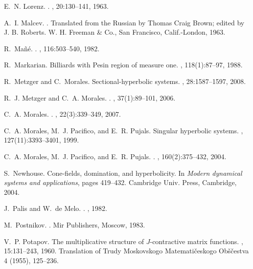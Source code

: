 \documentclass[12pt,reqno]{amsart}
\numberwithin{equation}{section}
\theoremstyle{plain}
\theoremstyle{definition}
\begin{document}
\begin{thebibliography}{10}
E.~N. Lorenz.
.
, {20}:{130--141}, {1963}.

A.~I. Mal{\cprime}cev.
.
\newblock Translated from the Russian by Thomas Craig Brown; edited by J. B.
  Roberts. W. H. Freeman \& Co., San Francisco, Calif.-London, 1963.

R.~Ma{\~n}{\'e}.
.
, {116}:{503--540}, {1982}.

R.~Markarian.
\newblock Billiards with {P}esin region of measure one.
, 118(1):87--97, 1988.

R.~Metzger and C.~Morales.
\newblock Sectional-hyperbolic systems.
, 28:1587--1597, 2008.

R.~J. Metzger and C.~A. Morales.
.
, {37}({1}):{89--101}, {2006}.

C.~A. Morales.
.
,
  {22}({3}):{339{--}349}, {2007}.

C.~A. Morales, M.~J. Pacifico, and E.~R. Pujals.
\newblock Singular hyperbolic systems.
, 127(11):3393--3401, 1999.

C.~A. Morales, M.~J. Pacifico, and E.~R. Pujals.
.
, {160}({2}):{375--432}, {2004}.

S.~Newhouse.
\newblock Cone-fields, domination, and hyperbolicity.
\newblock In {\em Modern dynamical systems and applications}, pages 419--432.
  Cambridge Univ. Press, Cambridge, 2004.

J.~Palis and W.~{de Melo}.
.
, {1982}.

M.~Postnikov.
.
\newblock Mir Publishers, Moscow, 1983.

V.~P. Potapov.
\newblock The multiplicative structure of {$J$}-contractive matrix functions.
, 15:131--243, 1960.
\newblock Translation of Trudy Moskovskogo Matemati\v ceskogo Ob\v s\v cestva 4
  (1955), 125--236.


\end{thebibliography}
\end{document}

